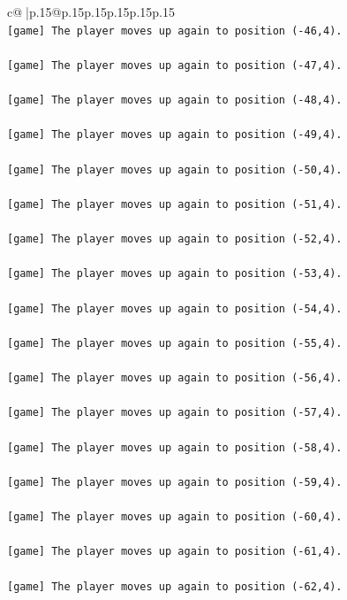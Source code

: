 \documentclass{article}
\begin{document}
{\begin{supertabular}{c@{$\;$}|p{.15\linewidth}@{}p{.15\linewidth}p{.15\linewidth}p{.15\linewidth}p{.15\linewidth}p{.15\linewidth}}
{{{\\ 
\texttt{{[}game{]} The player moves up again to position ({-}46,4).} \\
\\ 
\texttt{{[}game{]} The player moves up again to position ({-}47,4).} \\
\\ 
\texttt{{[}game{]} The player moves up again to position ({-}48,4).} \\
\\ 
\texttt{{[}game{]} The player moves up again to position ({-}49,4).} \\
\\ 
\texttt{{[}game{]} The player moves up again to position ({-}50,4).} \\
\\ 
\texttt{{[}game{]} The player moves up again to position ({-}51,4).} \\
\\ 
\texttt{{[}game{]} The player moves up again to position ({-}52,4).} \\
\\ 
\texttt{{[}game{]} The player moves up again to position ({-}53,4).} \\
\\ 
\texttt{{[}game{]} The player moves up again to position ({-}54,4).} \\
\\ 
\texttt{{[}game{]} The player moves up again to position ({-}55,4).} \\
\\ 
\texttt{{[}game{]} The player moves up again to position ({-}56,4).} \\
\\ 
\texttt{{[}game{]} The player moves up again to position ({-}57,4).} \\
\\ 
\texttt{{[}game{]} The player moves up again to position ({-}58,4).} \\
\\ 
\texttt{{[}game{]} The player moves up again to position ({-}59,4).} \\
\\ 
\texttt{{[}game{]} The player moves up again to position ({-}60,4).} \\
\\ 
\texttt{{[}game{]} The player moves up again to position ({-}61,4).} \\
\\ 
\texttt{{[}game{]} The player moves up again to position ({-}62,4).} \\
}}}
\end{supertabular}}
\end{document}
